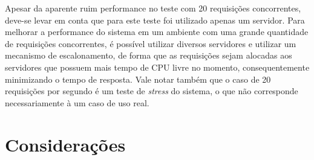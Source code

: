 Apesar da aparente ruim performance no teste com 20 requisições concorrentes, deve-se levar em conta que para este teste foi utilizado apenas um servidor.
Para melhorar a performance do sistema em um ambiente com uma grande quantidade de requisições concorrentes, é possível utilizar diversos servidores e utilizar um mecanismo de escalonamento, de forma que as requisições sejam alocadas aos servidores que possuem mais tempo de CPU livre no momento, consequentemente minimizando o tempo de resposta.
Vale notar também que o caso de 20 requisições por segundo é um teste de \emph{stress} do sistema, o que não corresponde necessariamente à um caso de uso real.

\section{Considerações}
\label{sec:consid}
